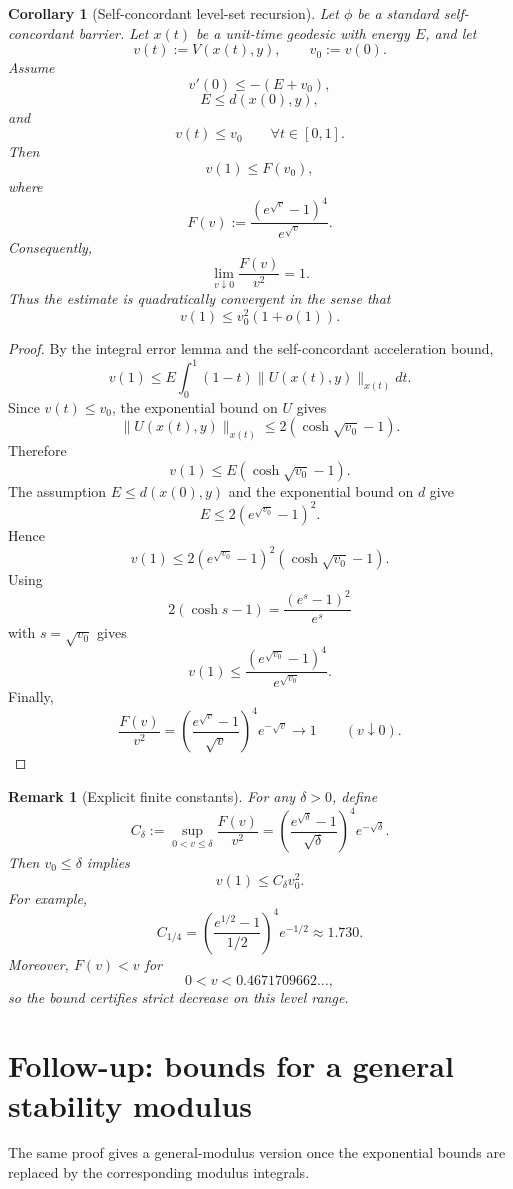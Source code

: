 \documentclass[11pt]{article}
\newtheorem{corollary}{Corollary}
\newtheorem{remark}{Remark}
\begin{document}
\begin{corollary}[Self-concordant level-set recursion]
Let $\phi$ be a standard self-concordant barrier. Let $x(t)$ be a unit-time geodesic with energy $E$, and let
\[
    v(t):=V(x(t),y),
    \qquad
    v_0:=v(0).
\]
Assume
\[
    v'(0)\le -(E+v_0),
\]
\[
    E\le d(x(0),y),
\]
and
\[
    v(t)
    \le
    v_0
    \qquad
    \forall t\in[0,1].
\]
Then
\[
    v(1)
    \le
    F(v_0),
\]
where
\[
    F(v):=\frac{(e^{\sqrt v}-1)^4}{e^{\sqrt v}}.
\]
Consequently,
\[
    \lim_{v\downarrow0}\frac{F(v)}{v^2}=1.
\]
Thus the estimate is quadratically convergent in the sense that
\[
    v(1)\le v_0^2(1+o(1)).
\]
\end{corollary}

\begin{proof}
By the integral error lemma and the self-concordant acceleration bound,
\[
    v(1)
    \le
    E\int_0^1(1-t)\|U(x(t),y)\|_{x(t)}dt.
\]
Since $v(t)\le v_0$, the exponential bound on $U$ gives
\[
    \|U(x(t),y)\|_{x(t)}
    \le
    2(\cosh\sqrt{v_0}-1).
\]
Therefore
\[
    v(1)
    \le
    E(\cosh\sqrt{v_0}-1).
\]
The assumption $E\le d(x(0),y)$ and the exponential bound on $d$ give
\[
    E
    \le
    2(e^{\sqrt{v_0}}-1)^2.
\]
Hence
\[
    v(1)
    \le
    2(e^{\sqrt{v_0}}-1)^2(\cosh\sqrt{v_0}-1).
\]
Using
\[
    2(\cosh s-1)=\frac{(e^s-1)^2}{e^s}
\]
with $s=\sqrt{v_0}$ gives
\[
    v(1)
    \le
    \frac{(e^{\sqrt{v_0}}-1)^4}{e^{\sqrt{v_0}}}.
\]
Finally,
\[
    \frac{F(v)}{v^2}
    =
    \left(\frac{e^{\sqrt v}-1}{\sqrt v}\right)^4e^{-\sqrt v}
    \to1
    \qquad(v\downarrow0).
\]
\end{proof}

\begin{remark}[Explicit finite constants]
For any $\delta>0$, define
\[
    C_\delta
    :=
    \sup_{0<v\le\delta}\frac{F(v)}{v^2}
    =
    \left(\frac{e^{\sqrt\delta}-1}{\sqrt\delta}\right)^4e^{-\sqrt\delta}.
\]
Then $v_0\le\delta$ implies
\[
    v(1)\le C_\delta v_0^2.
\]
For example,
\[
    C_{1/4}
    =
    \left(\frac{e^{1/2}-1}{1/2}\right)^4e^{-1/2}
    \approx1.730.
\]
Moreover, $F(v)<v$ for
\[
    0<v<0.4671709662\ldots,
\]
so the bound certifies strict decrease on this level range.
\end{remark}

\section{Follow-up: bounds for a general stability modulus}

The same proof gives a general-modulus version once the exponential bounds are replaced by the corresponding modulus integrals.
\end{document}

